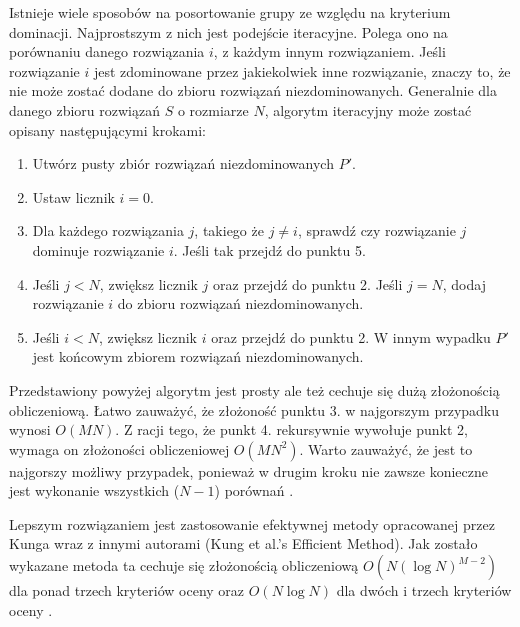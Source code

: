 \documentclass[twoside]{iisthesis}
\begin{document}
Istnieje wiele sposobów na posortowanie grupy ze względu na kryterium dominacji. Najprostszym z nich jest podejście iteracyjne. Polega ono na porównaniu danego rozwiązania $i$, z każdym innym rozwiązaniem. Jeśli rozwiązanie $i$ jest zdominowane przez jakiekolwiek inne rozwiązanie, znaczy to, że nie może zostać dodane do zbioru rozwiązań niezdominowanych. Generalnie dla danego zbioru rozwiązań $S$ o rozmiarze $N$, algorytm iteracyjny może zostać opisany następującymi krokami:\\

\begin{enumerate}
	\item Utwórz pusty zbiór rozwiązań niezdominowanych $P'$.
	\item Ustaw licznik $i = 0$.
	\item Dla każdego rozwiązania $j$, takiego że $j \neq i$, sprawdź czy rozwiązanie $j$ dominuje rozwiązanie $i$. Jeśli tak przejdź do punktu 5.
	\item Jeśli $j < N$, zwiększ licznik $j$ oraz przejdź do punktu 2. Jeśli $j = N$, dodaj rozwiązanie $i$ do zbioru rozwiązań niezdominowanych.
	\item Jeśli $i < N$, zwiększ licznik $i$ oraz przejdź do punktu 2. W innym wypadku $P'$ jest końcowym zbiorem rozwiązań niezdominowanych.\\
\end{enumerate}
Przedstawiony powyżej algorytm jest prosty ale też cechuje się dużą złożonością obliczeniową. Łatwo zauważyć, że złożoność punktu 3. w najgorszym przypadku wynosi $O(MN)$. Z racji tego, że punkt 4. rekursywnie wywołuje punkt 2, wymaga on złożoności obliczeniowej $O(MN^{2})$. Warto zauważyć, że jest to najgorszy możliwy przypadek, ponieważ w drugim kroku nie zawsze konieczne jest wykonanie wszystkich ($N-1$) porównań \cite{book}.

Lepszym rozwiązaniem jest zastosowanie efektywnej metody opracowanej przez Kunga wraz z innymi autorami (Kung et al.'s Efficient Method). Jak zostało wykazane metoda ta cechuje się złożonością obliczeniową $O(N(\log N)^{M-2})$ dla ponad trzech kryteriów oceny oraz $O(N\log N)$ dla dwóch i trzech kryteriów oceny \cite{kung}.
\end{document}
